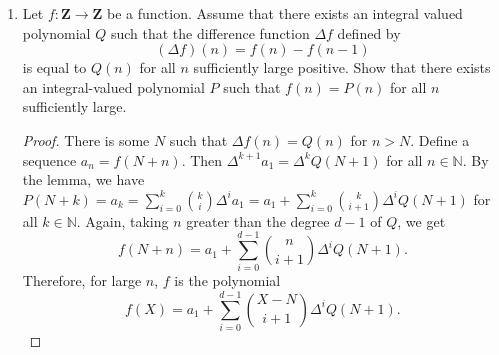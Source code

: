 \documentclass[10pt]{article}
\newcommand{\Q}{\mathbf{Q}}
\newcommand{\Z}{\mathbf{Z}}
\begin{document}
\begin{enumerate}
\begin{enumerate}
\begin{proof}
Now, take the sequence $a_n = P(n)$.  We know the elements are integral and hence so are the $k$th differences.  For any $n \geq d$, we have by the lemma
$$
P(n) = a_n = \sum_{k=0}^n \binom{n}{k} \Delta^k P(0)  = \sum_{k=0}^{d-1} \binom{n}{k} \Delta^k P(0)
$$
because $\Delta^{k} P(0) = 0$ for $k \geq d$.  Taking any $d$ integers greater than $d$, we see that $P$ agrees at these points with the polynomial
$$
\sum_{k=0}^{d-1} \binom{X}{k} \Delta^k P(0).
$$
Since $d$ points define a degree $d-1$ polynomial, this must be $P(X)$, which thus takes the stated form.
\begin{comment}
Now, recognize that the binomial coefficients $\binom{X}{r}$, for nonnegative integers $r$, form a basis for $\Q[X]$ over $\Q$.  We can define a linear operator on $\Q[X]$ by $X^r \mapsto \binom{X}{r}$.  This is clearly injective because the degrees of the images of $X^n$ and $X^m$ differ whenever $n \neq m$.  Since $\binom{X}{r}$ has degree $r$, the matrix of this transformation is upper-triangular and has nonzero diagonal elements, thus the mapping is surjective (since if we restrict to the span of a finite subset of basis vectors, we obtain a surjective mapping).  So this is an invertible map, meaning this matrix represents a change of basis, hence the binomial coefficients are indeed a basis.

Next, let $\Delta$ be the first difference operator on $\Q[X]$, i.e. $\Delta(f(X)) = f(X+1) - f(X)$.  $\Delta$ is easily seen to be a linear map, and also $\deg(\Delta(f(X)) < \deg(f(X))$.  Therefore, if $P$ has degree $d$, then $\Delta^d(P(X))$ is constant.
\end{comment}
\end{proof}

\item Let $f:\Z \rightarrow \Z$ be a function.  Assume that there exists an integral valued polynomial $Q$ such that the difference function $\Delta f$ defined by
$$
(\Delta f)(n) = f(n) - f(n-1)
$$
is equal to $Q(n)$ for all $n$ sufficiently large positive.  Show that there exists an integral-valued polynomial $P$ such that $f(n) = P(n)$ for all $n$ sufficiently large.

\begin{proof}
There is some $N$ such that $\Delta f(n) = Q(n)$ for $n > N$.  Define a sequence $a_n = f(N+n)$.  Then $\Delta^{k+1} a_1 = \Delta^k Q(N+1)$ for all $n \in \mathbb{N}$.  By the lemma, we have $P(N+k) = a_{k} = \sum_{i=0}^k \binom{k}{i}\Delta^i a_1 = a_1 + \sum_{i=0}^k \binom{k}{i+1}\Delta^i Q(N+1)$ for all $k \in \mathbb{N}$.  Again, taking $n$ greater than the degree $d-1$ of $Q$, we get
$$
f(N+n) = a_1 + \sum_{i=0}^{d-1} \binom{n}{i+1}\Delta^i Q(N+1).
$$
Therefore, for large $n$, $f$ is the polynomial
$$
f(X) = a_1 + \sum_{i=0}^{d-1} \binom{X-N}{i+1}\Delta^i Q(N+1).
$$


\end{proof}
\end{enumerate}
\end{enumerate}
\end{document}
